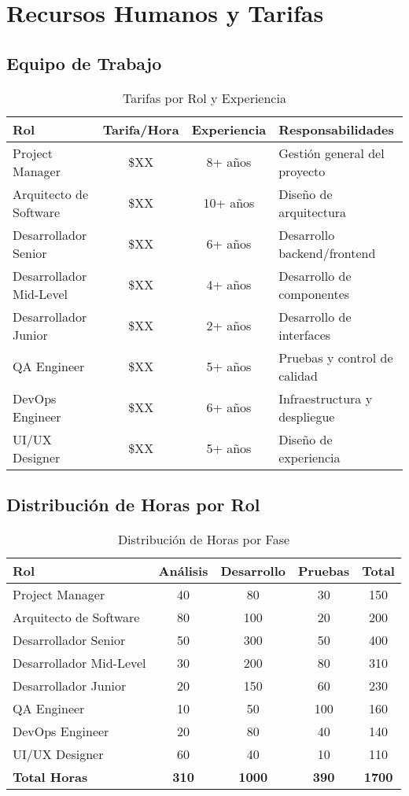 \section{Recursos Humanos y Tarifas}

\subsection{Equipo de Trabajo}
\begin{table}[h!]
\centering
\begin{tabular}{|l|c|c|l|}
\hline
\textbf{Rol} & \textbf{Tarifa/Hora} & \textbf{Experiencia} & \textbf{Responsabilidades} \\
\hline
Project Manager & \$XX & 8+ años & Gestión general del proyecto \\
Arquitecto de Software & \$XX & 10+ años & Diseño de arquitectura \\
Desarrollador Senior & \$XX & 6+ años & Desarrollo backend/frontend \\
Desarrollador Mid-Level & \$XX & 4+ años & Desarrollo de componentes \\
Desarrollador Junior & \$XX & 2+ años & Desarrollo de interfaces \\
QA Engineer & \$XX & 5+ años & Pruebas y control de calidad \\
DevOps Engineer & \$XX & 6+ años & Infraestructura y despliegue \\
UI/UX Designer & \$XX & 5+ años & Diseño de experiencia \\
\hline
\end{tabular}
\caption{Tarifas por Rol y Experiencia}
\end{table}

\subsection{Distribución de Horas por Rol}
\begin{table}[h!]
\centering
\begin{tabular}{|l|c|c|c|c|}
\hline
\textbf{Rol} & \textbf{Análisis} & \textbf{Desarrollo} & \textbf{Pruebas} & \textbf{Total} \\
\hline
Project Manager & 40 & 80 & 30 & 150 \\
Arquitecto de Software & 80 & 100 & 20 & 200 \\
Desarrollador Senior & 50 & 300 & 50 & 400 \\
Desarrollador Mid-Level & 30 & 200 & 80 & 310 \\
Desarrollador Junior & 20 & 150 & 60 & 230 \\
QA Engineer & 10 & 50 & 100 & 160 \\
DevOps Engineer & 20 & 80 & 40 & 140 \\
UI/UX Designer & 60 & 40 & 10 & 110 \\
\hline
\textbf{Total Horas} & \textbf{310} & \textbf{1000} & \textbf{390} & \textbf{1700} \\
\hline
\end{tabular}
\caption{Distribución de Horas por Fase}
\end{table}

